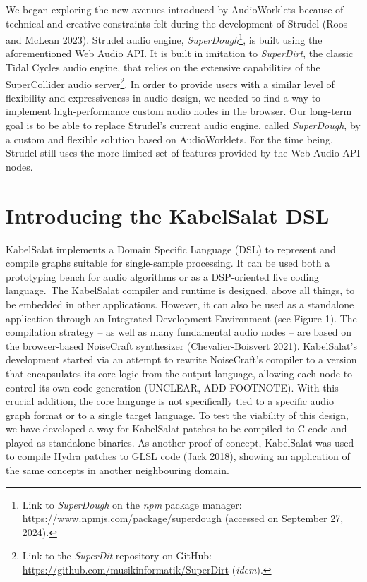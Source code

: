 \documentclass[11pt,]{article}
\begin{document}
We began exploring the new avenues introduced by AudioWorklets because
of technical and creative constraints felt during the development of
Strudel (Roos and McLean 2023). Strudel audio engine,
\emph{SuperDough}\footnote{Link to \emph{SuperDough} on the \emph{npm}
  package manager: \url{https://www.npmjs.com/package/superdough}
  (accessed on September 27, 2024).}, is built using the aforementioned
Web Audio API. It is built in imitation to \emph{SuperDirt}, the classic
Tidal Cycles audio engine, that relies on the extensive capabilities of
the SuperCollider audio server\footnote{Link to the \emph{SuperDit}
  repository on GitHub:
  \url{https://github.com/musikinformatik/SuperDirt} (\emph{idem}).}. In
order to provide users with a similar level of flexibility and
expressiveness in audio design, we needed to find a way to implement
high-performance custom audio nodes in the browser. Our long-term goal
is to be able to replace Strudel's current audio engine, called
\emph{SuperDough}, by a custom and flexible solution based on
AudioWorklets. For the time being, Strudel still uses the more limited
set of features provided by the Web Audio API nodes.

\section{Introducing the KabelSalat
DSL}\label{introducing-the-kabelsalat-dsl}

KabelSalat implements a Domain Specific Language (DSL) to represent and
compile graphs suitable for single-sample processing. It can be used
both a prototyping bench for audio algorithms or as a DSP-oriented live
coding language.~The KabelSalat compiler and runtime is designed, above
all things, to be embedded in other applications. However, it can also
be used as a standalone application through an Integrated Development
Environment (see Figure 1). The compilation strategy -- as well as many
fundamental audio nodes -- are based on the browser-based NoiseCraft
synthesizer (Chevalier-Boisvert 2021). KabelSalat's development started
via an attempt to rewrite NoiseCraft's compiler to a version that
encapsulates its core logic from the output language, allowing each node
to control its own code generation (UNCLEAR, ADD FOOTNOTE). With this
crucial addition, the core language is not specifically tied to a
specific audio graph format or to a single target language. To test the
viability of this design, we have developed a way for KabelSalat patches
to be compiled to C code and played as standalone binaries. As another
proof-of-concept, KabelSalat was used to compile Hydra patches to GLSL
code (Jack 2018), showing an application of the same concepts in another
neighbouring domain.
\end{document}
